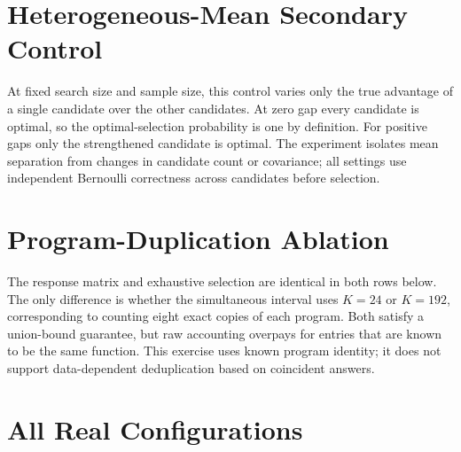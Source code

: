 \documentclass{article}
\begin{document}
\section{Heterogeneous-Mean Secondary Control}
At fixed search size and sample size, this control varies only the true advantage of a single candidate over the other candidates. At zero gap every candidate is optimal, so the optimal-selection probability is one by definition. For positive gaps only the strengthened candidate is optimal. The experiment isolates mean separation from changes in candidate count or covariance; all settings use independent Bernoulli correctness across candidates before selection.
\begin{table}[h]
\caption{Secondary heterogeneous means, $K=64$, $n=128$, 4,000 repetitions. True gap, optimism, and oracle regret are pp; probabilities and coverage are percent. Entries are mean $\pm1$ MCSE.}
\centering\small
\end{table}

\section{Program-Duplication Ablation}\label{app:duplicates}
The response matrix and exhaustive selection are identical in both rows below. The only difference is whether the simultaneous interval uses $K=24$ or $K=192$, corresponding to counting eight exact copies of each program. Both satisfy a union-bound guarantee, but raw accounting overpays for entries that are known to be the same function. This exercise uses known program identity; it does not support data-dependent deduplication based on coincident answers.
\begin{table}[h]
\caption{Duplicate-program ablation, real empirical population, $n=128$. Entries are mean $\pm1$ MCSE; optimism and width are pp, coverage is percent.}
\centering\small
\end{table}

\clearpage
\section{All Real Configurations}
\begin{table}[h]
\caption{Descriptive accuracies of all frozen configurations. These audit scores are released for transparency; they are not used to replace the locked primary choice. Each split contains 1,024 questions.}
\centering\small
\end{table}
\end{document}

